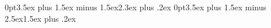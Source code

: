 \usepackage{xparse,ifthen}
\usepackage[sc,calcwidth]{titlesec}
\usepackage{changepage}
\usepackage{graphicx}
\usepackage{caption}
\usepackage{fancyhdr}
\usepackage{marginnote}
\usepackage{lettrine}

\usepackage{lineno}


\newlength\mylen
\setlength{\headheight}{14pt}

\titlespacing*{\section} {0pt}{3.5ex plus 1.5ex minus 1.5ex}{2.3ex plus .2ex}
\titlespacing*{\subsection} {0pt}{3.5ex plus 1.5ex minus 2.5ex}{1.5ex plus .2ex}

\DeclareDocumentCommand{}
  {\let\cleardoublepage\relax
    \ifthenelse{\isodd{\value{page}}}
      {\mbox{}\clearpage}{\mbox{}\clearpage\mbox{}\clearpage}%
    \resizebox{.9\textwidth}{.9\textheight}{\texttt{[image: \#3]}}
    \mbox{}\thispagestyle{empty}\clearpage
  }

